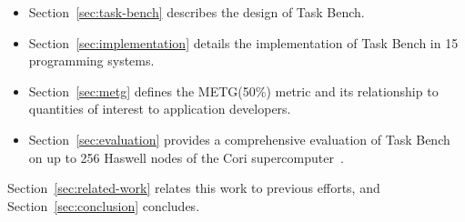 
\begin{itemize}
\item Section~\ref{sec:task-bench} describes the design of Task Bench.
\item Section~\ref{sec:implementation} details the implementation of
  Task Bench in 15 programming systems.
\item Section~\ref{sec:metg} defines the METG(50\%) metric and its
  relationship to quantities of interest to application developers.
\item Section~\ref{sec:evaluation} provides a comprehensive evaluation
  of Task Bench on up to 256 Haswell nodes of the Cori
  supercomputer~\cite{Cori}.
\end{itemize}

Section~\ref{sec:related-work} relates this work to previous efforts,
and Section~\ref{sec:conclusion} concludes.
